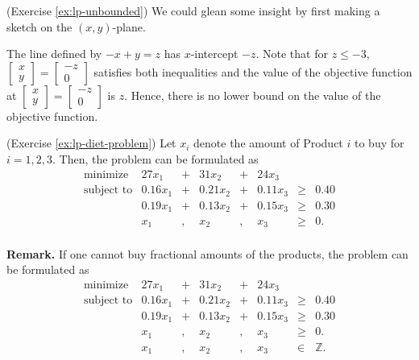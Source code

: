 \begin{solution}(Exercise \ref{ex:lp-unbounded})
We could glean some insight by first making a sketch on the
\((x,y)\)-plane.

The line defined by \(-x + y = z\) has \(x\)-intercept \(-z\). Note
that for \(z \leq -3\),
\(\begin{bmatrix} x\\y \end{bmatrix} = \begin{bmatrix} -z\\ 0\end{bmatrix}\)
satisfies both inequalities and the value of the objective function at
\(\begin{bmatrix} x\\y \end{bmatrix} = \begin{bmatrix} -z\\ 0\end{bmatrix}\)
is \(z\). Hence, there is no lower bound on the value of the objective
function.
\end{solution}

\begin{solution}(Exercise \ref{ex:lp-diet-problem})
Let \(x_i\) denote the amount of Product \(i\) to buy for
\(i = 1,2,3\). Then, the problem can be formulated as
\[
\begin{array}{rrcrcrll}
\text{minimize } & 27 x_1 & + & 31 x_2 & + & 24 x_3 \\
\text{subject to}
& 0.16 x_1 & + & 0.21 x_2 & + & 0.11 x_3 & \geq & 0.40 \\
& 0.19 x_1 & + & 0.13 x_2 & + & 0.15 x_3 & \geq & 0.30 \\
& x_1 & , & x_2 & , & x_3 & \geq & 0. \\
\end{array}
\]

\textbf{Remark.} If one cannot buy fractional amounts of the products,
the problem can be formulated as
\[
\begin{array}{rrcrcrll}
\text{minimize } & 27 x_1 & + & 31 x_2 & + & 24 x_3 \\
\text{subject to}
& 0.16 x_1 & + & 0.21 x_2 & + & 0.11 x_3 & \geq & 0.40 \\
& 0.19 x_1 & + & 0.13 x_2 & + & 0.15 x_3 & \geq & 0.30 \\
& x_1 & , & x_2 & , & x_3 & \geq & 0. \\
& x_1 & , & x_2 & , & x_3 & \in & \mathbb{Z}. \\
\end{array}
\]
\end{solution}

